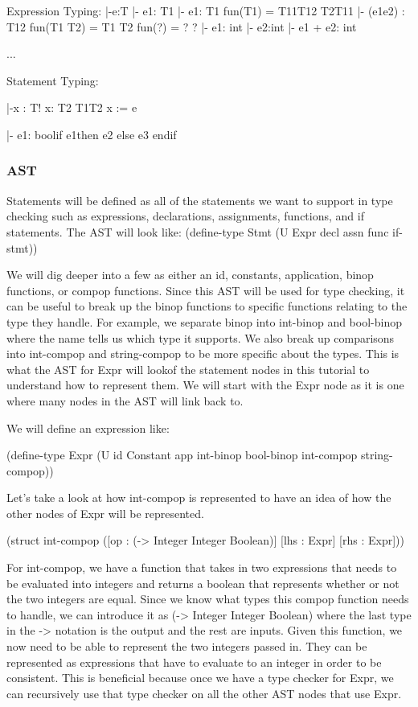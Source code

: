 Expression Typing:  |-e:T
 |- e1: T1  |- e1: T1
fun(T1) = T11T12  T2T11 |- (e1e2) : T12
fun(T1 T2) = T1 T2
fun(?) = ? ?
 |- e1: int   |- e2:int |- e1 + e2: int

...

Statement Typing:

 |-x : T!  x: T2 T1T2 x := e

 |- e1: boolif e1then e2 else e3 endif

\subsubsection{AST}
Statements will be defined as all of the statements we want to support in type checking such as expressions, declarations, assignments, functions, and if statements. The AST will look like:
(define-type Stmt
  (U Expr decl assn func if-stmt))

We will dig deeper into a few  as either an id, constants, application, binop functions, or compop functions. Since this AST will be used for type checking, it can be useful to break up the binop functions to specific functions relating to the type they handle. For example, we separate binop into int-binop and bool-binop where the name tells us which type it supports. We also break up comparisons into int-compop and string-compop to be more specific about the types. This is what the AST for Expr will lookof the statement nodes in this tutorial to understand how to represent them. We will start with the Expr node as it is one where many nodes in the AST will link back to.

We will define an expression like:

(define-type Expr
  (U id Constant app int-binop bool-binop int-compop string-compop))

Let’s take a look at how int-compop is represented to have an idea of how the other nodes of Expr will be represented.

(struct int-compop
  ([op  : (-> Integer Integer Boolean)]
   [lhs : Expr]
   [rhs : Expr]))

For int-compop, we have a function that takes in two expressions that needs to be evaluated into integers and returns a boolean that represents whether or not the two integers are equal. Since we know what types this compop function needs to handle, we can introduce it as (-> Integer Integer Boolean) where the last type in the -> notation is the output and the rest are inputs. Given this function, we now need to be able to represent the two integers passed in. They can be represented as expressions that have to evaluate to an integer in order to be consistent. This is beneficial because once we have a type checker for Expr, we can recursively use that type checker on all the other AST nodes that use Expr. 

